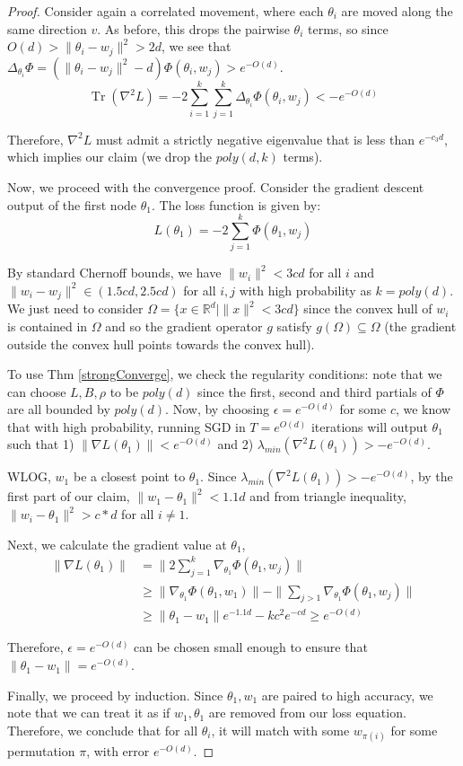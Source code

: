 \documentclass{article}
\newcommand{\R}{{\mathbb{R}}}
\DeclareMathOperator{\Tr}{Tr}
\begin{document}
\begin{proof}
Consider again a correlated movement, where each $\theta_i$ are moved along the same direction $v$. As before, this drops the pairwise $\theta_i$ terms, so since $O(d) > \|\theta_i -w_j\|^2 > 2d$, we see that $\Delta_{\theta_i} \Phi = (\|\theta_i -w_j\|^2 - d)\Phi(\theta_i,w_j) > e^{-O(d)}$. 
%
\[\Tr(\nabla^2 L) = -2\sum_{i=1}^k \sum_{j=1}^k \Delta_{\theta_i}\Phi(\theta_i, w_j) < -e^{-O(d)}\]

Therefore, $\nabla^2 L$ must admit a strictly negative eigenvalue that
is less than $e^{-c_3 d}$, which implies our claim (we drop the
$poly(d,k)$ terms).

Now, we proceed with the convergence proof. Consider the gradient descent output of the first node $\theta_1$. The loss function is given by:
%
\[L(\theta_1) =  - 2\sum_{j=1}^k \Phi(\theta_1,w_j)\]

By standard Chernoff bounds, we have $\|w_i\|^2 < 3cd$ for all $i$ and $\|w_i -w_j\|^2 \in (1.5cd, 2.5cd)$ for all $i, j$ with high probability as $k = poly(d)$. We just need to consider $\Omega = \{ x \in \R^d | \|x \|^2 < 3cd\}$ since the convex hull of $w_i$ is contained in $\Omega$ and so the gradient operator $g$ satisfy $g(\Omega) \subseteq \Omega$ (the gradient outside the convex hull points towards the convex hull).  

To use Thm \ref{strongConverge}, we check the regularity conditions: note that we can choose $L, B, \rho$ to be $poly(d)$ since the first, second and third partials of $\Phi$ are all bounded by $poly(d)$. Now, by choosing $\epsilon = e^{-O(d)}$ for some $c$, we know that with high probability, running SGD in $T = e^{O(d)}$ iterations will output $\theta_1$ such that 1) $\|\nabla L (\theta_1)\| < e^{-O(d)}$ and 2) $\lambda_{min}(\nabla^2L(\theta_1)) > -e^{-O(d)}$.

WLOG, $w_1$ be a closest point to $\theta_1$. Since  $\lambda_{min}(\nabla^2L(\theta_1)) > -e^{-O(d)}$, by the first part of our claim, $\|w_1 - \theta_1\|^2 < 1.1d$ and from triangle inequality, $\|w_i - \theta_1 \|^2 > c*d$ for all $i \neq 1$. 

Next, we calculate the gradient value at $\theta_1$, 
\begin{align*}
\|\nabla L(\theta_1)\| & = \|2\sum_{j=1}^k
                         \nabla_{\theta_1}\Phi(\theta_1,w_j)\| \\
& \geq \|\nabla_{\theta_1} \Phi(\theta_1,w_1) \| - \|\sum_{j>1}
  \nabla_{\theta_1}\Phi(\theta_1,w_j)\| \\
& \geq \|\theta_1-w_1\|e^{-1.1d} - kc^2e^{-cd} \geq e^{-O(d)} 
\end{align*}

Therefore, $\epsilon = e^{-O(d)}$ can be chosen small enough to ensure that $\|\theta_1 - w_1\| = e^{-O(d)}$. 

Finally, we proceed by induction. Since $\theta_1, w_1$ are paired to high accuracy, we note that we can treat it as if $w_1, \theta_1$ are removed from our loss equation. Therefore, we conclude that for all $\theta_i$, it will match with some $w_{\pi(i)}$ for some permutation $\pi$, with error $e^{-O(d)}$. 
\end{proof}
\end{document}
